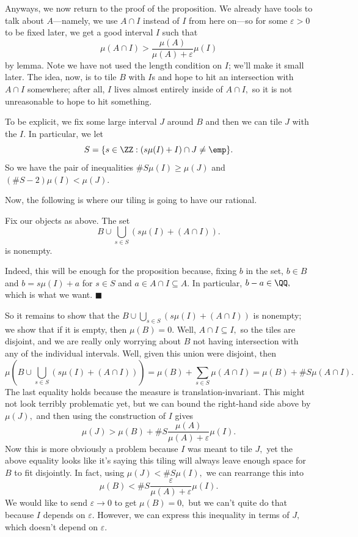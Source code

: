 Anyways, we now return to the proof of the proposition. We already have tools to talk about $A$---namely, we use $A\cap I$ instead of $I$ from here on---so for some $\varepsilon>0$ to be fixed later, we get a good interval $I$ such that
\[\mu(A\cap I)>\frac{\mu(A)}{\mu(A)+\varepsilon}\mu(I)\]
by lemma. Note we have not used the length condition on $I$; we'll make it small later. The idea, now, is to tile $B$ with $I$s and hope to hit an intersection with $A\cap I$ somewhere; after all, $I$ lives almost entirely inside of $A\cap I,$ so it is not unreasonable to hope to hit something.

To be explicit, we fix some large interval $J$ around $B$ and then we can tile $J$ with the $I.$ In particular, we let
\[S=\{s\in\ZZ:(s\mu(I)+I)\cap J\ne\emp\}.\]
So we have the pair of inequalities $\#S\mu(I)\ge\mu(J)$ and $(\#S-2)\mu(I)<\mu(J).$

Now, the following is where our tiling is going to have our rational.
\begin{lemma}
    Fix our objects as above. The set
    \[B\cup\bigcup_{s\in S}(s\mu(I)+(A\cap I)).\]
    is nonempty.
\end{lemma}
Indeed, this will be enough for the proposition because, fixing $b$ in the set, $b\in B$ and $b=s\mu(I)+a$ for $s\in S$ and $a\in A\cap I\subseteq A.$ In particular, $b-a\in\QQ,$ which is what we want. $\blacksquare$

So it remains to show that the $B\cup\bigcup_{s\in S}(s\mu(I)+(A\cap I))$ is nonempty; we show that if it is empty, then $\mu(B)=0.$ Well, $A\cap I\subseteq I,$ so the tiles are disjoint, and we are really only worrying about $B$ not having intersection with any of the individual intervals. Well, given this union were disjoint, then
\[\mu\left(B\cup\bigcup_{s\in S}(s\mu(I)+(A\cap I))\right)=\mu(B)+\sum_{s\in S}\mu(A\cap I)=\mu(B)+\#S\mu(A\cap I).\]
The last equality holds because the measure is translation-invariant. This might not look terribly problematic yet, but we can bound the right-hand side above by $\mu(J),$ and then using the construction of $I$ gives
\[\mu(J)>\mu(B)+\#S\frac{\mu(A)}{\mu(A)+\varepsilon}\mu(I).\]
Now this is more obviously a problem because $I$ was meant to tile $J,$ yet the above equality looks like it's saying this tiling will always leave enough space for $B$ to fit disjointly. In fact, using $\mu(J)<\#S\mu(I),$ we can rearrange this into
\[\mu(B)<\#S\frac\varepsilon{\mu(A)+\varepsilon}\mu(I).\]
We would like to send $\varepsilon\to0$ to get $\mu(B)=0,$ but we can't quite do that because $I$ depends on $\varepsilon.$ However, we can express this inequality in terms of $J,$ which doesn't depend on $\varepsilon.$

